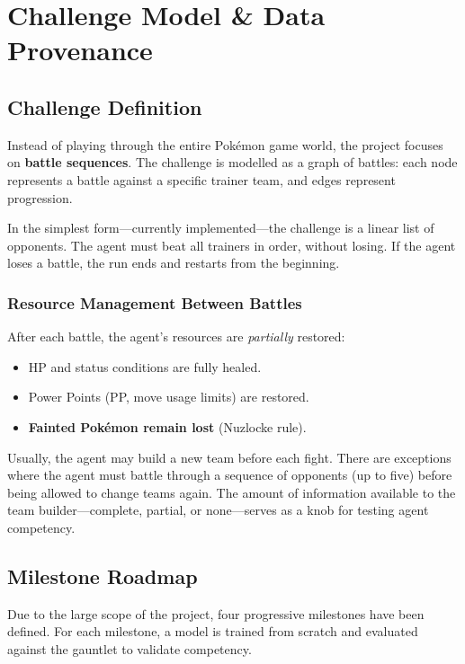 \chapter{Challenge Model \& Data Provenance}
\label{ch:challenge}

\section{Challenge Definition}

Instead of playing through the entire Pok\'{e}mon game world, the project
focuses on \textbf{battle sequences}.  The challenge is modelled as a graph of
battles: each node represents a battle against a specific trainer team, and
edges represent progression.

In the simplest form---currently implemented---the challenge is a linear list
of opponents.  The agent must beat all trainers in order, without losing.  If
the agent loses a battle, the run ends and restarts from the beginning.

\subsection{Resource Management Between Battles}

After each battle, the agent's resources are \emph{partially} restored:

\begin{itemize}
  \item HP and status conditions are fully healed.
  \item Power Points (PP, move usage limits) are restored.
  \item \textbf{Fainted Pok\'{e}mon remain lost} (Nuzlocke rule).
\end{itemize}

Usually, the agent may build a new team before each fight.  There are
exceptions where the agent must battle through a sequence of opponents (up to
five) before being allowed to change teams again.  The amount of information
available to the team builder---complete, partial, or none---serves as a knob
for testing agent competency.

\section{Milestone Roadmap}

Due to the large scope of the project, four progressive milestones have been
defined.  For each milestone, a model is trained from scratch and evaluated
against the gauntlet to validate competency.

